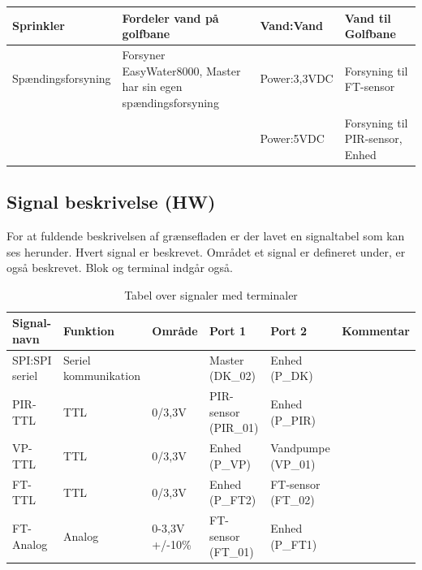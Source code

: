 \begin{table}[H]
\begin{small}
\begin{tabular}{|p{}|p{}|p{}|p{}|}
Sprinkler & Fordeler vand på golfbane & Vand:Vand & Vand til Golfbane \\ \hline

Spændingsforsyning & Forsyner EasyWater8000, Master har sin egen spændingsforsyning & Power:3,3VDC & Forsyning til FT-sensor \\ \cline{3-4}
& & Power:5VDC 		& Forsyning til PIR-sensor, Enhed 	\\ \hline
\end{tabular}
\end{small}
\label{table:Bloktabel}
\end{table}

\begin{table}[H]
\subsection{Signal beskrivelse (HW)}
For at fuldende beskrivelsen af grænsefladen er der lavet en signaltabel som kan ses herunder. Hvert signal er beskrevet. Området et signal er defineret under, er også beskrevet. Blok og terminal indgår også. 
\caption{Tabel over signaler med terminaler}
\begin{small}
\begin{tabular}{|p{2cm}|p{2cm}|p{2cm}|p{2cm}|p{2cm}|p{}|}
\hline

\textbf{Signal-navn}	&\textbf{Funktion} 		&\textbf{Område} &\textbf{Port 1} 	&\textbf{Port 2} 			&\textbf{Kommentar} \\ \hline

SPI:SPI seriel 			&Seriel kommunikation 	& 				&Master (DK\_02)		&Enhed (P\_DK)			&					 \\\hline

PIR-TTL 					&TTL 					&0\slash3,3V 	&PIR-sensor (PIR\_01) &Enhed (P\_PIR)			&					\\\hline
VP-TTL 					&TTL 					&0\slash3,3V 	&Enhed (P\_VP)  &Vandpumpe (VP\_01)				&					\\\hline
					
FT-TTL					&TTL						&0\slash3,3V 	&Enhed (P\_FT2) &FT-sensor (FT\_02)				&	    				\\\hline
FT-Analog				&Analog 					&0-3,3V 	\newline +/-10\%	&FT-sensor (FT\_01) &Enhed (P\_FT1)				&	    				\\\hline

\end{tabular}
\end{small}
\label{table:Signaltabel}
\end{table}

